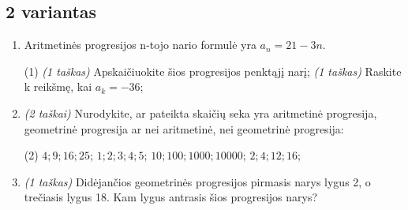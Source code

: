 \documentclass[a4paper]{article}
\begin{document}
\subsection*{2 variantas}

\begin{enumerate}
      \item Aritmetinės progresijos n-tojo nario formulė yra $a_{n}=21-3n$.

            \begin{tasks}[item-format={\normalfont}, after-item-skip=2mm](1)
                  \task \textit{(1 taškas)} Apskaičiuokite šios progresijos
                  penktąjį
                  narį;
                  \task \textit{(1 taškas)} Raskite k reikšmę, kai $a_k=-36$;
            \end{tasks}

      \item \textit{(2 taškai)} Nurodykite, ar pateikta skaičių seka yra
            aritmetinė progresija, geometrinė progresija ar nei aritmetinė, nei
            geometrinė progresija:
            \begin{tasks}[item-format={\normalfont}, after-item-skip=2mm](2)
                  \task $4; 9; 16; 25$;
                  \task $1;2;3;4;5$;
                  \task $10; 100; 1000; 10000$;
                  \task $2;4;12;16$;
            \end{tasks}

      \item \textit{(1 taškas)} Didėjančios geometrinės progresijos pirmasis
            narys lygus 2, o trečiasis lygus 18. Kam lygus antrasis šios
            progresijos narys?


\end{enumerate}
\end{document}
